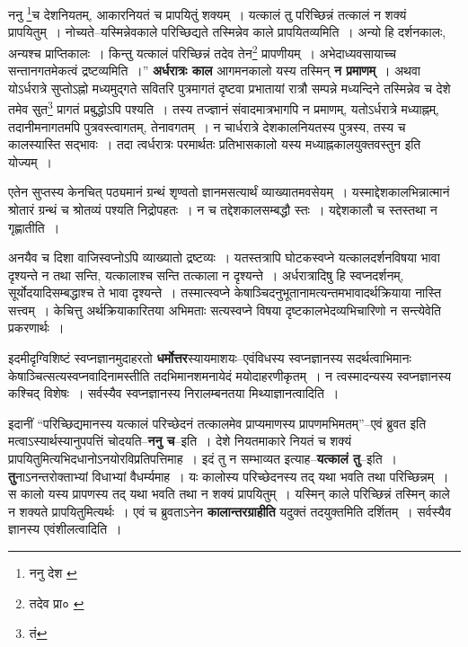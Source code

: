 \documentclass[article,12pt,a4paper]{memoir}
\begin{document}
	ननु \footnote{ननु देश \cite{dp-msA} \cite{dp-edP} \cite{dp-edE}}च देशनियतम्, आकारनियतं च प्रापयितुं शक्यम् । यत्कालं तु परिच्छिन्नं तत्कालं न शक्यं प्रापयितुम् । नोच्यते--यस्मिन्नेवकाले परिच्छिद्यते तस्मिन्नेव काले प्रापयितव्यमिति । अन्यो हि दर्शनकालः, अन्यश्च प्राप्तिकालः । किन्तु यत्कालं परिच्छिन्नं तदेव तेन\footnote{तदेव प्रा० \cite{dp-msD} \cite{dp-msA} \cite{dp-edP} \cite{dp-edE}} प्रापणीयम् । अभेदाध्यवसायाच्च सन्तानगतमेकत्वं द्रष्टव्यमिति ।” \textbf{अर्धरात्रः काल} आगमनकालो यस्य तस्मिन् \textbf{न प्रमाणम्} । अथवा योऽर्धरात्रे सुप्तोऽह्नो मध्यमुद्गते सवितरि पुत्रमागतं दृष्टवा प्रभातायां रात्रौ सम्पन्ने मध्यन्दिने तस्मिन्नेव च देशे तमेव सुत\footnote{तं} प्रागतं प्रबुद्धोऽपि पश्यति । तस्य तज्ज्ञानं संवादमात्रभागपि न प्रमाणम्, यतोऽर्धरात्रे मध्याह्नम्, तदानीमनागतमपि पुत्रवस्त्वागतम्, तेनावगतम् । न चार्धरात्रे देशकालनियतस्य पुत्रस्य, तस्य च कालस्यास्ति सद्भावः । तदा त्वर्धरात्रः परमार्थतः प्रतिभासकालो यस्य मध्याह्नकालयुक्तवस्तुन इति योज्यम् ।
	\pend
      

	  \pstart एतेन सुप्तस्य केनचित् पठ्यमानं ग्रन्थं शृण्वतो ज्ञानमसत्यार्थं व्याख्यातमवसेयम् । यस्माद्देशकालभिन्नात्मानं श्रोतारं ग्रन्थं च श्रोतव्यं पश्यति निद्रोपहतः । न च तद्देशकालसम्बद्धौ स्तः । यद्देशकालौ च स्तस्तथा न गृह्णातीति ।
	\pend
      

	  \pstart अनयैव च दिशा वाजिस्वप्नोऽपि व्याख्यातो द्रष्टव्यः । यतस्तत्रापि घोटकस्वप्ने यत्कालदर्शनवि\leavevmode{}षया भावा दृश्यन्ते न तथा सन्ति, यत्कालाश्च सन्ति तत्काला न दृश्यन्ते । अर्धरात्रादिषु हि स्वप्नदर्शनम्, सूर्योदयादिसम्बद्धाश्च ते भावा दृश्यन्ते । तस्मात्स्वप्ने केषाञ्चिदनुभूतानामत्यन्तमभावादर्थक्रियाया नास्ति सत्त्वम् । केचित्तु अर्थक्रियाकारितया अभिमताः सत्यस्वप्ने विषया दृष्टकालभेदव्यभिचारिणो न सन्त्येवेति प्रकरणार्थः ।
	\pend
      

	  \pstart इदमीदृग्विशिष्टं स्वप्नज्ञानमुदाहरतो \textbf{धर्मोत्तर}स्यायमाशयः--एवंविधस्य स्वप्नज्ञानस्य सदर्थत्वाभिमानः केषाञ्चित्सत्यस्वप्नवादिनामस्तीति तदभिमानशमनायेदं मयोदाहरणीकृतम् । न त्वस्मादन्यस्य स्वप्नज्ञानस्य कश्चिद् विशेषः । सर्वस्यैव स्वप्नज्ञानस्य निरालम्बनतया मिथ्याज्ञानत्वादिति ।
	\pend
      

	  \pstart इदानीं “परिच्छिद्यमानस्य यत्कालं परिच्छेदनं तत्कालमेव प्राप्यमाणस्य प्रापणमभिमतम्”--एवं ब्रुवत इति मत्वाऽस्यार्थस्यानुपपत्तिं चोदयति--\textbf{ननु च}--इति । देशे नियतमाकारे नियतं च शक्यं प्रापयितुमित्यभिदधानोऽनयोरविप्रतिपत्तिमाह । इदं तु न सम्भाव्यत इत्याह--\textbf{यत्कालं तु}--इति । \textbf{तु}नाऽनन्तरोक्ताभ्यां विधाभ्यां वैधर्म्यमाह । यः कालोस्य परिच्छेदनस्य तद् यथा भवति तथा परिच्छिन्नम् । स कालो यस्य प्रापणस्य तद् यथा भवति तथा न शक्यं प्रापयितुम् । यस्मिन् काले परिच्छिन्नं तस्मिन् काले न शक्यते प्रापयितुमित्यर्थः । एवं च ब्रुवताऽनेन \textbf{कालान्तरग्राहीति} यदुक्तं तदयुक्तमिति दर्शितम् । सर्वस्यैव ज्ञानस्य एवंशीलत्वादिति ।
	\pend
      
\end{document}
